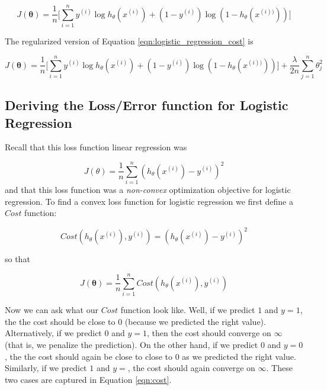 \documentclass[11pt, oneside]{article}   	%
\begin{document}
 \begin{equation}
 J(\boldsymbol{\theta}) = \frac{1}{n} \Bigg [ \sum\limits_{i = 1}^{n}
 y^{(i)} \log h_{\theta}(x^{(i)}) +
 (1 - y^{(i)}) \log (1 - h_{\theta}(x^{(i))})) \Bigg]
\label{eqn:logistic_regression_cost}
\end{equation}

\bigskip
\noindent
The regularized version of Equation \ref{eqn:logistic_regression_cost} is

\begin{equation}
\label{eqn:normalized_lr}
J(\boldsymbol{\theta}) = \frac{1}{n} \Bigg [ \sum\limits_{i = 1}^{n}
 y^{(i)} \log h_{\theta}(x^{(i)}) +
 (1 - y^{(i)}) \log (1 - h_{\theta}(x^{(i))})) \Bigg] +
 \frac{\lambda}{2n} \sum\limits_{j = 1}^{n}\theta_{j}^{2}
\end{equation}
\bigskip

\subsection{Deriving the Loss/Error function for Logistic Regression}

Recall that this loss function linear regression was
 
\begin{equation}
J(\theta) = \frac{1}{n}\sum\limits_{i = 1}^{n}
(h_{\theta}(x^{(i)}) - y^{(i)})^2
\end{equation}
and that this loss function was a \emph{non-convex} optimization objective for logistic regression. To find a convex loss function for logistic regression we first define a $Cost$ function:

\begin{equation}
Cost(h_{\theta}(x^{(i)}),y^{(i)}) = (h_{\theta}(x^{(i)}) - y^{(i)})^2
\end{equation}

\bigskip
\noindent
so that 

\begin{equation}
J(\boldsymbol{\theta}) = \frac{1}{n} \sum\limits_{i = 1}^{n} Cost(h_{\theta}(x^{(i)}),y^{(i)}) 
\end{equation}

\bigskip
\noindent
Now we can ask what our $Cost$ function look like.  Well, if we predict $1$ and $y = 1$, the the cost should be close to $0$ (because we predicted the right value). Alternatively, if we predict $0$ and $y = 1$, then the cost should converge on $\infty$ (that is, we penalize the prediction). On the other hand, if we predict $0$ and $y =0$, the the cost should again be close to close to $0$ as we predicted the right value. Similarly, if we predict $1$ and $y =$, the cost should again converge on $\infty$. These two cases are captured in Equation \ref{eqn:cost}.
\end{document}
